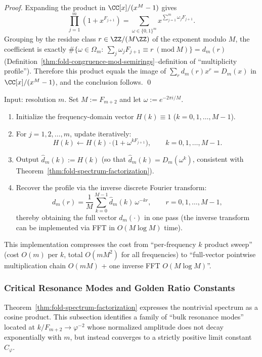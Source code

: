 \begin{proof}
Expanding the product in \(\CC[x]/(x^{M}-1)\) gives
\[
\prod_{j=1}^{m}\left(1+x^{F_{j+1}}\right)
=\sum_{\omega\in\{0,1\}^m}x^{\sum_{j=1}^m \omega_jF_{j+1}}.
\]
Grouping by the residue class \(r\in\ZZ/(M\ZZ)\) of the exponent modulo \(M\), the coefficient is exactly
\(
\#\{\omega\in\Omega_m:\ \sum_j \omega_jF_{j+1}\equiv r\ (\mathrm{mod}\ M)\}
=d_m(r)
\)
(Definition~\ref{thm:fold-congruence-mod-semirings}--definition of ``multiplicity profile''). Therefore this product equals the image of \(\sum_r d_m(r)x^r=D_m(x)\) in \(\CC[x]/(x^M-1)\), and the conclusion follows. \qed
\end{proof}

\begin{algorithm}\label{alg:fold-multiplicity-fft}
Input: resolution \(m\). Set \(M:=F_{m+2}\) and let \(\omega:=e^{-2\pi i/M}\).
\begin{enumerate}
  \item Initialize the frequency-domain vector \(H(k)\equiv 1\) (\(k=0,1,\dots,M-1\)).
  \item For \(j=1,2,\dots,m\), update iteratively:
  \[
  H(k)\leftarrow H(k)\cdot \bigl(1+\omega^{kF_{j+1}}\bigr),\qquad k=0,1,\dots,M-1.
  \]
  \item Output \(\widehat d_m(k):=H(k)\) (so that \(\widehat d_m(k)=D_m(\omega^k)\), consistent with Theorem~\ref{thm:fold-spectrum-factorization}).
  \item Recover the profile via the inverse discrete Fourier transform:
  \[
  d_m(r)=\frac{1}{M}\sum_{k=0}^{M-1}\widehat d_m(k)\,\omega^{-kr},
  \qquad r=0,1,\dots,M-1,
  \]
  thereby obtaining the full vector \(d_m(\cdot)\) in one pass (the inverse transform can be implemented via FFT in \(O(M\log M)\) time).
\end{enumerate}
This implementation compresses the cost from ``per-frequency \(k\) product sweep'' (cost \(O(m)\) per \(k\), total \(O(mM^2)\) for all frequencies) to ``full-vector pointwise multiplication chain \(O(mM)\) + one inverse FFT \(O(M\log M)\)''.
\end{algorithm}

\subsubsection{Critical Resonance Modes and Golden Ratio Constants}
\label{subsubsec:fold-critical-resonance}

Theorem~\ref{thm:fold-spectrum-factorization} expresses the nontrivial spectrum as a cosine product. This subsection identifies a family of ``bulk resonance modes'' located at
\(
k/F_{m+2}\to \varphi^{-2}
\)
whose normalized amplitude does not decay exponentially with $m$, but instead converges to a strictly positive limit constant \(C_\varphi\).

